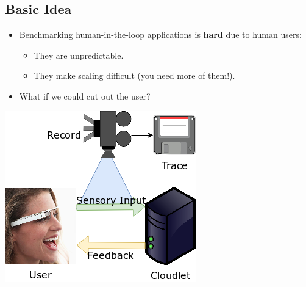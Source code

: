 \documentclass[portrait, a1]{KTHEEposter}
\begin{document}
\begin{pcolumns}[3]
\begin{pcolumn}[2]
\begin{pframe}[1.25]
            \section{Basic Idea}
            \begin{itemize}
                \item Benchmarking human-in-the-loop applications is \textbf{hard} due to human users:
                      \begin{itemize}
                          \item They are unpredictable.
                          \item They make scaling difficult (you need more of them!).
                      \end{itemize}
                \item What if we could cut out the user?
            \end{itemize}
            \medskip
            \begin{center}
                \medskip
                \makeatletter
                \let\theoldfigure=\fnum@figure
                \renewcommand{\fnum@figure}{Step~\thefigure}
                \makeatother
                \includegraphics[width=.7\linewidth]{img/trace_idea_1}

                \medskip\medskip


\end{center}
\end{pframe}
\end{pcolumn}
\end{pcolumns}
\end{document}
